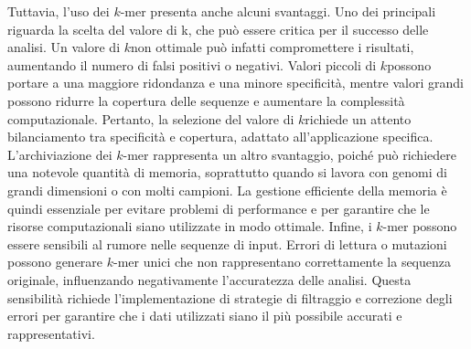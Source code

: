 	Tuttavia, l'uso dei $k$-mer presenta anche alcuni svantaggi. Uno dei principali riguarda la scelta del valore di k, che può essere critica per il successo delle analisi. Un valore di $k$non ottimale può infatti compromettere i risultati, aumentando il numero di falsi positivi o negativi. Valori piccoli di $k$possono portare a una maggiore ridondanza e una minore specificità, mentre valori grandi possono ridurre la copertura delle sequenze e aumentare la complessità computazionale. Pertanto, la selezione del valore di $k$richiede un attento bilanciamento tra specificità e copertura, adattato all'applicazione specifica. L'archiviazione dei $k$-mer rappresenta un altro svantaggio, poiché può richiedere una notevole quantità di memoria, soprattutto quando si lavora con genomi di grandi dimensioni o con molti campioni. La gestione efficiente della memoria è quindi essenziale per evitare problemi di performance e per garantire che le risorse computazionali siano utilizzate in modo ottimale. Infine, i $k$-mer possono essere sensibili al rumore nelle sequenze di input. Errori di lettura o mutazioni possono generare $k$-mer unici che non rappresentano correttamente la sequenza originale, influenzando negativamente l'accuratezza delle analisi. Questa sensibilità richiede l'implementazione di strategie di filtraggio e correzione degli errori per garantire che i dati utilizzati siano il più possibile accurati e rappresentativi.

